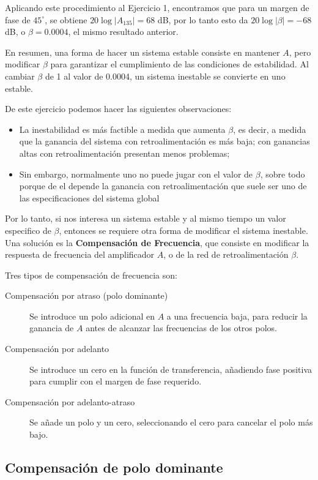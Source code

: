 Aplicando este procedimiento al Ejercicio 1, encontramos que para un margen de fase de $45^\circ$, se obtiene $20 \log |A_{135}| = 68$ dB, por lo tanto esto da $20 \log |\beta| = -68$ dB, o $\beta = 0.0004$, el mismo resultado anterior.

En resumen, una forma de hacer un sistema estable consiste en mantener $A$, pero modificar $\beta$ para garantizar el cumplimiento de las condiciones de estabilidad. Al cambiar $\beta$ de 1 al valor de 0.0004, un sistema inestable se convierte en uno estable.

De este ejercicio podemos hacer las siguientes observaciones:

\begin{itemize}
	\item La inestabilidad es más factible a medida que aumenta $\beta$, es decir, a medida que la ganancia del sistema con retroalimentación es más baja; con ganancias altas con retroalimentación presentan menos problemas;
	\item Sin embargo, normalmente uno no puede jugar con el valor de $\beta$, sobre todo porque de el depende la ganancia con retroalimentación que suele ser uno de las especificaciones del sistema global
\end{itemize}

Por lo tanto, si nos interesa un sistema estable y al mismo tiempo un valor especifico de $\beta$, entonces se requiere otra forma de modificar el sistema inestable. Una solución es la \textbf{Compensación de Frecuencia}, que consiste en modificar la respuesta de frecuencia del amplificador $A$, o de la red de retroalimentación $\beta$.

Tres tipos de compensación de frecuencia son:

\begin{description}
	\item[Compensación por atraso (polo dominante)] Se introduce un polo adicional en \( A \) a una frecuencia baja, para reducir la ganancia de \( A \) antes de alcanzar las frecuencias de los otros polos.
	\item[Compensación por adelanto] Se introduce un cero en la función de transferencia, añadiendo fase positiva para cumplir con el margen de fase requerido.
	\item[Compensación por adelanto-atraso] Se añade un polo y un cero, seleccionando el cero para cancelar el polo más bajo.
\end{description}

\subsection{Compensación de polo dominante} %

